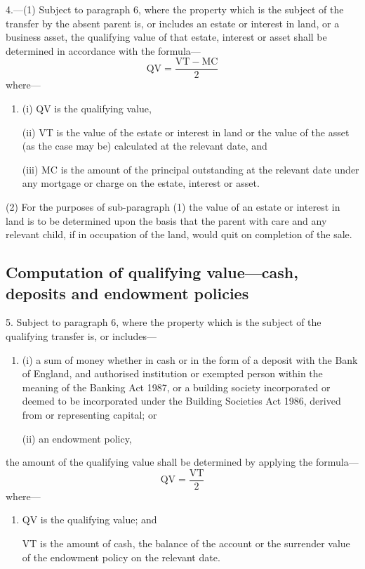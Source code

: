 \documentclass[a4paper]{article}
\begin{document}
4.—(1) Subject to paragraph 6, where the property which is the subject of the transfer by the absent parent is, or includes an estate or interest in land, or a business asset, the qualifying value of that estate, interest or asset shall be determined in accordance with the formula—
\[\mathrm{QV} = \frac{\mathrm{VT} - \mathrm{MC}}{2}\]
where—
\begin{enumerate}\item[]
(i) QV is the qualifying value,

(ii) VT is the value of the estate or interest in land or the value of the asset (as the case may be) calculated at the relevant date, and

(iii) MC is the amount of the principal outstanding at the relevant date under any mortgage or charge on the estate, interest or asset.
\end{enumerate}

(2) For the purposes of sub-paragraph (1) the value of an estate or interest in land is to be determined upon the basis that the parent with care and any relevant child, if in occupation of the land, would quit on completion of the sale.

\subsection*{Computation of qualifying value—cash, deposits and endowment policies}

5.  Subject to paragraph 6, where the property which is the subject of the qualifying transfer is, or includes—
\begin{enumerate}\item[]
(i) a sum of money whether in cash or in the form of a deposit with the Bank of England, and authorised institution or exempted person within the meaning of the Banking Act 1987, or a building society incorporated or deemed to be incorporated under the Building Societies Act 1986, derived from or representing capital; or

(ii) an endowment policy,
\end{enumerate}
the amount of the qualifying value shall be determined by applying the formula—
\[ \mathrm{QV} = \frac{\mathrm{VT}}{2}\]
where—
\begin{enumerate}\item[]
QV is the qualifying value; and

VT is the amount of cash, the balance of the account or the surrender value of the endowment policy on the relevant date.
\end{enumerate}
\end{document}

